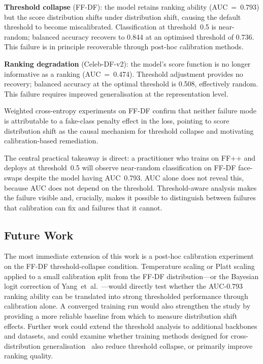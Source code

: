 \documentclass[a4paper,12pt]{report}
\begin{document}
\textbf{Threshold collapse} (FF-DF): the model retains
ranking ability (AUC~=~0.793) but the score distribution
shifts under distribution shift, causing the default
threshold to become miscalibrated.
Classification at threshold~0.5 is near-random; balanced
accuracy recovers to 0.844 at an optimised threshold of
0.736.
This failure is in principle recoverable through
post-hoc calibration methods.

\textbf{Ranking degradation} (Celeb-DF-v2): the model's
score function is no longer informative as a ranking
(AUC~=~0.474).
Threshold adjustment provides no recovery; balanced
accuracy at the optimal threshold is 0.508, effectively
random.
This failure requires improved generalisation at the
representation level.

Weighted cross-entropy experiments on FF-DF confirm that
neither failure mode is attributable to a fake-class
penalty effect in the loss, pointing to score distribution
shift as the causal mechanism for threshold collapse and
motivating calibration-based remediation.

The central practical takeaway is direct: a practitioner
who trains on FF++ and deploys at threshold~0.5 will
observe near-random classification on FF-DF face-swaps
despite the model having AUC~0.793.
AUC alone does not reveal this, because AUC does not
depend on the threshold.
Threshold-aware analysis makes the failure visible and,
crucially, makes it possible to distinguish between
failures that calibration can fix and failures that it
cannot.

\subsection*{Future Work}

The most immediate extension of this work is a post-hoc
calibration experiment on the FF-DF threshold-collapse
condition.
Temperature scaling or Platt scaling applied to a small
calibration split from the FF-DF distribution---or the
Bayesian logit correction of Yang~et~al.~\cite{aigicalib2025}---would
directly test whether the AUC-0.793 ranking ability can
be translated into strong thresholded performance through
calibration alone.
A converged training run would also strengthen the study
by providing a more reliable baseline from which to
measure distribution shift effects.
Further work could extend the threshold analysis to
additional backbones and datasets, and could examine
whether training methods designed for cross-distribution
generalisation~\cite{lsda2024,p_and_p2025,gend2025}
also reduce threshold collapse, or primarily improve
ranking quality.
\end{document}
